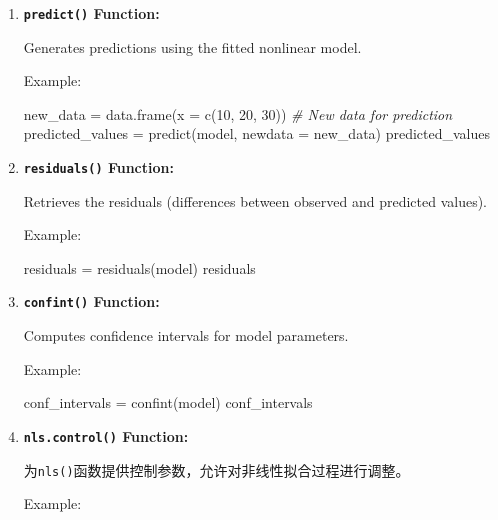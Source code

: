 \documentclass[
]{article}
\newenvironment{Shaded}{}{}
\newcommand{\AttributeTok}[1]{\textcolor[rgb]{0.49,0.56,0.16}{#1}}
\newcommand{\CommentTok}[1]{\textcolor[rgb]{0.38,0.63,0.69}{\textit{#1}}}
\newcommand{\DecValTok}[1]{\textcolor[rgb]{0.25,0.63,0.44}{#1}}
\newcommand{\FunctionTok}[1]{\textcolor[rgb]{0.02,0.16,0.49}{#1}}
\newcommand{\NormalTok}[1]{#1}
\newcommand{\OtherTok}[1]{\textcolor[rgb]{0.00,0.44,0.13}{#1}}
\begin{document}
\begin{enumerate}
\def\labelenumi{\arabic{enumi}.}
\item
  \textbf{\texttt{predict()} Function:}

  Generates predictions using the fitted nonlinear model.

  Example:

\begin{Shaded}
\begin{Highlighting}[]
\NormalTok{new\_data }\OtherTok{=} \FunctionTok{data.frame}\NormalTok{(}\AttributeTok{x =} \FunctionTok{c}\NormalTok{(}\DecValTok{10}\NormalTok{, }\DecValTok{20}\NormalTok{, }\DecValTok{30}\NormalTok{))  }\CommentTok{\# New data for prediction}
\NormalTok{predicted\_values }\OtherTok{=} \FunctionTok{predict}\NormalTok{(model, }\AttributeTok{newdata =}\NormalTok{ new\_data)}
\NormalTok{predicted\_values}
\end{Highlighting}
\end{Shaded}
\item
  \textbf{\texttt{residuals()} Function:}

  Retrieves the residuals (differences between observed and predicted
  values).

  Example:

\begin{Shaded}
\begin{Highlighting}[]
\NormalTok{residuals }\OtherTok{=} \FunctionTok{residuals}\NormalTok{(model)}
\NormalTok{residuals}
\end{Highlighting}
\end{Shaded}
\item
  \textbf{\texttt{confint()} Function:}

  Computes confidence intervals for model parameters.

  Example:

\begin{Shaded}
\begin{Highlighting}[]
\NormalTok{conf\_intervals }\OtherTok{=} \FunctionTok{confint}\NormalTok{(model)}
\NormalTok{conf\_intervals}
\end{Highlighting}
\end{Shaded}
\item
  \textbf{\texttt{nls.control()} Function:}

  为\texttt{nls()}函数提供控制参数，允许对非线性拟合过程进行调整。

  Example:


\end{enumerate}
\end{document}
